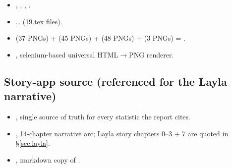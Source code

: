 \begin{itemize}\setlength{\itemsep}{0pt}
 \item {}, , ,
 .
 \item {} \ldots
  (19.tex files).
 \item {} (37 PNGs) +
  (45 PNGs) +
  (48 PNGs) +
  (3 PNGs) = .
 \item {}, selenium-based universal
 HTML$\to$PNG renderer.
\end{itemize}

\subsection{Story-app source (referenced for the Layla narrative)}

\begin{itemize}\setlength{\itemsep}{0pt}
 \item {}, single source of truth for every
 statistic the report cites.
 \item {}, 14-chapter narrative arc;
 Layla story chapters 0--3 + 7 are quoted in
 \S\ref{sec:layla}.
 \item {}, markdown copy of .
\end{itemize}
